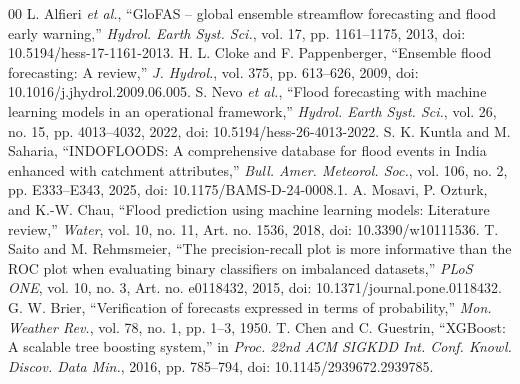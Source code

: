 \documentclass[conference]{IEEEtran}
\begin{document}
\begin{thebibliography}{00}
 L. Alfieri \textit{et al.}, ``GloFAS -- global ensemble streamflow forecasting and flood early warning,'' \textit{Hydrol. Earth Syst. Sci.}, vol. 17, pp. 1161--1175, 2013, doi: 10.5194/hess-17-1161-2013.
 H. L. Cloke and F. Pappenberger, ``Ensemble flood forecasting: A review,'' \textit{J. Hydrol.}, vol. 375, pp. 613--626, 2009, doi: 10.1016/j.jhydrol.2009.06.005.
 S. Nevo \textit{et al.}, ``Flood forecasting with machine learning models in an operational framework,'' \textit{Hydrol. Earth Syst. Sci.}, vol. 26, no. 15, pp. 4013--4032, 2022, doi: 10.5194/hess-26-4013-2022.
 S. K. Kuntla and M. Saharia, ``INDOFLOODS: A comprehensive database for flood events in India enhanced with catchment attributes,'' \textit{Bull. Amer. Meteorol. Soc.}, vol. 106, no. 2, pp. E333--E343, 2025, doi: 10.1175/BAMS-D-24-0008.1.
 A. Mosavi, P. Ozturk, and K.-W. Chau, ``Flood prediction using machine learning models: Literature review,'' \textit{Water}, vol. 10, no. 11, Art. no. 1536, 2018, doi: 10.3390/w10111536.
 T. Saito and M. Rehmsmeier, ``The precision-recall plot is more informative than the ROC plot when evaluating binary classifiers on imbalanced datasets,'' \textit{PLoS ONE}, vol. 10, no. 3, Art. no. e0118432, 2015, doi: 10.1371/journal.pone.0118432.
 G. W. Brier, ``Verification of forecasts expressed in terms of probability,'' \textit{Mon. Weather Rev.}, vol. 78, no. 1, pp. 1--3, 1950.
 T. Chen and C. Guestrin, ``XGBoost: A scalable tree boosting system,'' in \textit{Proc. 22nd ACM SIGKDD Int. Conf. Knowl. Discov. Data Min.}, 2016, pp. 785--794, doi: 10.1145/2939672.2939785.
\end{thebibliography}
\end{document}
